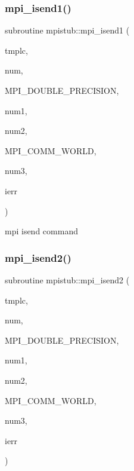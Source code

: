 \subsubsection{\texorpdfstring{mpi\_isend1()}{mpi\_isend1()}}
{\footnotesize\ttfamily subroutine mpistub\+::mpi\+\_\+isend1 (\begin{DoxyParamCaption}\item[{double precision, dimension(\+:)}]{tmplc,  }\item[{}]{num,  }\item[{}]{M\+P\+I\+\_\+\+D\+O\+U\+B\+L\+E\+\_\+\+P\+R\+E\+C\+I\+S\+I\+ON,  }\item[{}]{num1,  }\item[{}]{num2,  }\item[{}]{M\+P\+I\+\_\+\+C\+O\+M\+M\+\_\+\+W\+O\+R\+LD,  }\item[{}]{num3,  }\item[{}]{ierr }\end{DoxyParamCaption})}



mpi isend command 

\mbox{\label{namespacempistub_ac35bd42a69c258e2cc6e8db36212b3aa}} 
\subsubsection{\texorpdfstring{mpi\_isend2()}{mpi\_isend2()}}
{\footnotesize\ttfamily subroutine mpistub\+::mpi\+\_\+isend2 (\begin{DoxyParamCaption}\item[{double precision}]{tmplc,  }\item[{}]{num,  }\item[{}]{M\+P\+I\+\_\+\+D\+O\+U\+B\+L\+E\+\_\+\+P\+R\+E\+C\+I\+S\+I\+ON,  }\item[{}]{num1,  }\item[{}]{num2,  }\item[{}]{M\+P\+I\+\_\+\+C\+O\+M\+M\+\_\+\+W\+O\+R\+LD,  }\item[{}]{num3,  }\item[{}]{ierr }\end{DoxyParamCaption})}

\mbox{\label{namespacempistub_a47d130d2122c960528cefcdd0295e596}} 
